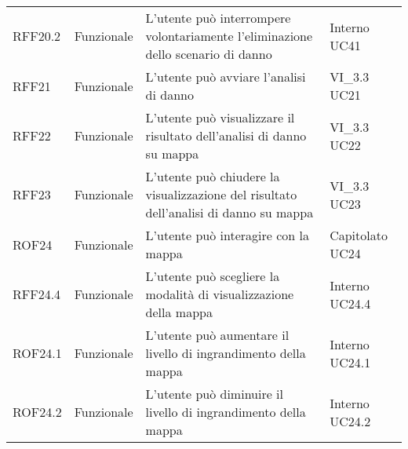 \begin{longtable}{p{2cm}!{\VRule[1pt]}p{2cm}!{\VRule[1pt]}p{5cm}!{\VRule[1pt]}p{1.5cm}}
	\\
	RFF20.2                          & Funzionale\newline               & L'utente può interrompere volontariamente l'eliminazione dello scenario di danno                                         & Interno \newline UC41        
	\\
	RFF21                            & Funzionale\newline               & L'utente può avviare l'analisi di danno                                                                                  & VI_3.3 \newline UC21         
	\\
	RFF22                            & Funzionale\newline               & L'utente può visualizzare il risultato dell'analisi di danno su mappa                                                    & VI_3.3 \newline UC22         
	\\
	RFF23                            & Funzionale\newline               & L'utente può chiudere la visualizzazione del risultato dell'analisi di danno su mappa                                    & VI_3.3 \newline UC23         
	\\
	ROF24                            & Funzionale\newline               & L'utente può interagire con la mappa                                                                                     & Capitolato \newline UC24     
	\\
	RFF24.4                          & Funzionale\newline               & L'utente può scegliere la  modalità  di visualizzazione della mappa                                                     & Interno \newline UC24.4      
	\\
	ROF24.1                          & Funzionale\newline               & L'utente può aumentare il livello di ingrandimento della mappa                                                           & Interno \newline UC24.1      
	\\
	ROF24.2                          & Funzionale\newline               & L'utente può diminuire il livello di ingrandimento della mappa                                                           & Interno \newline UC24.2      

\end{longtable}
